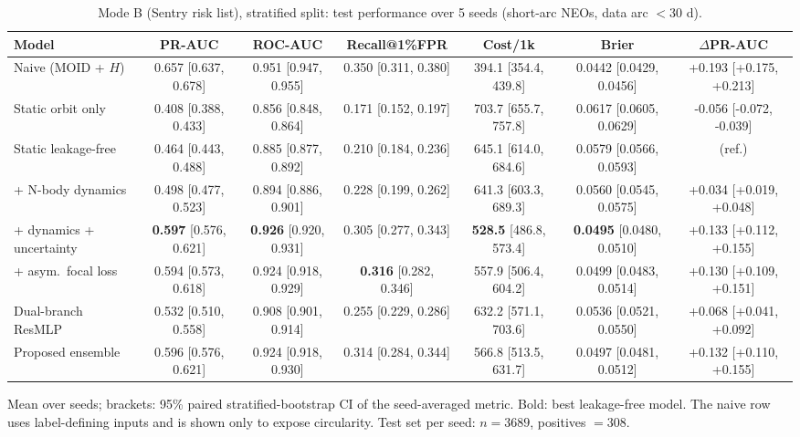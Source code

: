 \begin{table}[t]
\centering
\small
\caption{Mode B (Sentry risk list), stratified split: test performance over 5 seeds (short-arc NEOs, data arc $<30$ d).}
\label{tab:sentry_stratified_short_arc}
\begin{tabular}{lcccccc}
\toprule
Model & PR-AUC & ROC-AUC & Recall@1\%FPR & Cost/1k & Brier & $\Delta$PR-AUC \\
\midrule
Naive (MOID + $H$) & 0.657 \scriptsize{[0.637, 0.678]} & 0.951 \scriptsize{[0.947, 0.955]} & 0.350 \scriptsize{[0.311, 0.380]} & 394.1 \scriptsize{[354.4, 439.8]} & 0.0442 \scriptsize{[0.0429, 0.0456]} & +0.193 \scriptsize{[+0.175, +0.213]} \\
\midrule
Static orbit only & 0.408 \scriptsize{[0.388, 0.433]} & 0.856 \scriptsize{[0.848, 0.864]} & 0.171 \scriptsize{[0.152, 0.197]} & 703.7 \scriptsize{[655.7, 757.8]} & 0.0617 \scriptsize{[0.0605, 0.0629]} & -0.056 \scriptsize{[-0.072, -0.039]} \\
Static leakage-free & 0.464 \scriptsize{[0.443, 0.488]} & 0.885 \scriptsize{[0.877, 0.892]} & 0.210 \scriptsize{[0.184, 0.236]} & 645.1 \scriptsize{[614.0, 684.6]} & 0.0579 \scriptsize{[0.0566, 0.0593]} & (ref.) \\
+ N-body dynamics & 0.498 \scriptsize{[0.477, 0.523]} & 0.894 \scriptsize{[0.886, 0.901]} & 0.228 \scriptsize{[0.199, 0.262]} & 641.3 \scriptsize{[603.3, 689.3]} & 0.0560 \scriptsize{[0.0545, 0.0575]} & +0.034 \scriptsize{[+0.019, +0.048]} \\
+ dynamics + uncertainty & \textbf{0.597} \scriptsize{[0.576, 0.621]} & \textbf{0.926} \scriptsize{[0.920, 0.931]} & 0.305 \scriptsize{[0.277, 0.343]} & \textbf{528.5} \scriptsize{[486.8, 573.4]} & \textbf{0.0495} \scriptsize{[0.0480, 0.0510]} & +0.133 \scriptsize{[+0.112, +0.155]} \\
+ asym.\ focal loss & 0.594 \scriptsize{[0.573, 0.618]} & 0.924 \scriptsize{[0.918, 0.929]} & \textbf{0.316} \scriptsize{[0.282, 0.346]} & 557.9 \scriptsize{[506.4, 604.2]} & 0.0499 \scriptsize{[0.0483, 0.0514]} & +0.130 \scriptsize{[+0.109, +0.151]} \\
Dual-branch ResMLP & 0.532 \scriptsize{[0.510, 0.558]} & 0.908 \scriptsize{[0.901, 0.914]} & 0.255 \scriptsize{[0.229, 0.286]} & 632.2 \scriptsize{[571.1, 703.6]} & 0.0536 \scriptsize{[0.0521, 0.0550]} & +0.068 \scriptsize{[+0.041, +0.092]} \\
Proposed ensemble & 0.596 \scriptsize{[0.576, 0.621]} & 0.924 \scriptsize{[0.918, 0.930]} & 0.314 \scriptsize{[0.284, 0.344]} & 566.8 \scriptsize{[513.5, 631.7]} & 0.0497 \scriptsize{[0.0481, 0.0512]} & +0.132 \scriptsize{[+0.110, +0.155]} \\
\bottomrule
\end{tabular}
\par\vspace{2pt}\footnotesize Mean over seeds; brackets: 95\% paired stratified-bootstrap CI of the seed-averaged metric. Bold: best leakage-free model. The naive row uses label-defining inputs and is shown only to expose circularity. Test set per seed: $n=3689$, positives $=308$.
\end{table}

